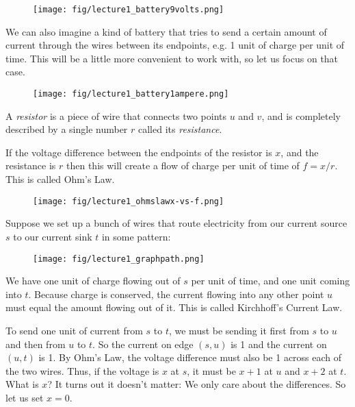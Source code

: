 \begin{figure}[H]
  \centering
  \texttt{[image: fig/lecture1\_battery9volts.png]}
  \label{fig:battery-volt}
\end{figure}

We can also imagine a kind of battery that tries to send a certain
amount of current through the wires between its endpoints, e.g. 1 unit of charge per
unit of time.
This will be a little more convenient to work with, so let us focus on
that case.

\begin{figure}[H]
  \centering
  \texttt{[image: fig/lecture1\_battery1ampere.png]}
  \label{fig:battery-current}
\end{figure}

A \emph{resistor} is a piece of wire that connects two
points $u$ and $v$, and is completely described by a single number $r$
called its \emph{resistance}.

If the voltage difference between the endpoints of the resistor is
$x$, and the resistance is $r$ then this will create a flow of charge per unit of time of $f = x / r$.
This is called Ohm's Law.

\begin{figure}[H]
  \centering
  \texttt{[image: fig/lecture1\_ohmslawx-vs-f.png]}
  \label{fig:ohmslaw}
\end{figure}

Suppose we set up a bunch of wires that route electricity from our
current source $s$ to our current sink $t$ in some pattern:

\begin{figure}[H]
  \centering
  \texttt{[image: fig/lecture1\_graphpath.png]}
  \label{fig:graphpath}
\end{figure}

We have one unit of charge flowing out of $s$ per unit of time, and
one unit coming into $t$.
Because charge is conserved, the current flowing into any other point
$u$ must equal the amount flowing out of it.
This is called Kirchhoff's Current Law.

To send one unit of current from $s$ to $t$, we must be sending it
first from $s$ to $u$ and then from $u$ to $t$.
So the current on edge $(s,u)$ is 1 and the current on $(u,t)$ is 1.
By Ohm's Law, the voltage difference must also be 1 across each of the two
wires.
Thus, if the voltage is $x$ at $s$, it must be $x+1$ at $u$ and $x+2$
at $t$. What is $x$? It turns out it doesn't matter: We only care
about the differences. So let us set $x = 0$.

